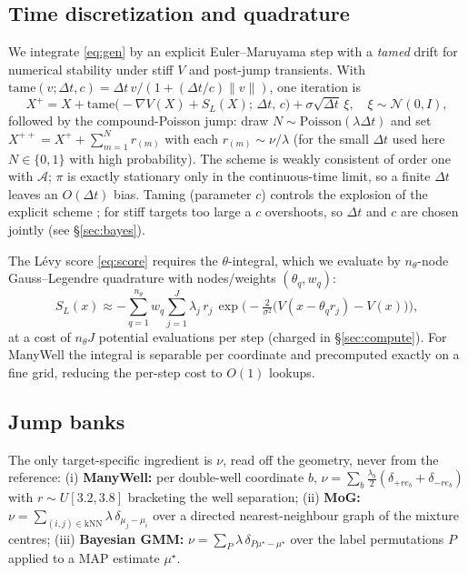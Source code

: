 \documentclass[11pt]{article}
\theoremstyle{plain}
\theoremstyle{remark}
\begin{document}
\subsection{Time discretization and quadrature}
We integrate \eqref{eq:gen} by an explicit Euler--Maruyama step with a
\emph{tamed} drift for numerical stability under stiff $V$ and post-jump
transients. With $\mathrm{tame}(v;\Delta t,c)=\Delta t\,v/(1+(\Delta t/c)\|v\|)$,
one iteration is
\begin{equation}\label{eq:euler}
X^{+}=X+\mathrm{tame}\!\big(-\nabla V(X)+S_L(X);\,\Delta t,\,c\big)+\sigma\sqrt{\Delta t}\,\xi,
\quad \xi\sim\mathcal N(0,I),
\end{equation}
followed by the compound-Poisson jump: draw $N\sim\mathrm{Poisson}(\lambda\Delta t)$
and set $X^{++}=X^{+}+\sum_{m=1}^{N} r_{(m)}$ with each $r_{(m)}\sim\nu/\lambda$
(for the small $\Delta t$ used here $N\in\{0,1\}$ with high probability). The
scheme is weakly consistent of order one with $\mathcal A$; $\pi$ is exactly
stationary only in the continuous-time limit, so a finite $\Delta t$ leaves an
$O(\Delta t)$ bias. Taming (parameter $c$) controls the explosion of the explicit
scheme \cite{hutzenthaler2012}; for stiff targets too large a $c$ overshoots, so
$\Delta t$ and $c$ are chosen jointly (see \S\ref{sec:bayes}).

The L\'evy score \eqref{eq:score} requires the $\theta$-integral, which we evaluate
by $n_\theta$-node Gauss--Legendre quadrature with nodes/weights
$(\theta_q,w_q)$:
\[
S_L(x)\approx-\sum_{q=1}^{n_\theta} w_q\sum_{j=1}^{J}\lambda_j\,r_j\,
\exp\!\Big(-\tfrac{2}{\sigma^2}\big(V(x-\theta_q r_j)-V(x)\big)\Big),
\]
at a cost of $n_\theta J$ potential evaluations per step (charged in
\S\ref{sec:compute}). For ManyWell the integral is separable per coordinate and
precomputed exactly on a fine grid, reducing the per-step cost to $O(1)$ lookups.

\subsection{Jump banks}
The only target-specific ingredient is $\nu$, read off the geometry, never from the
reference: (i) \textbf{ManyWell:} per double-well coordinate $b$,
$\nu=\sum_b \tfrac{\lambda_b}{2}(\delta_{+r e_b}+\delta_{-r e_b})$ with
$r\sim U[3.2,3.8]$ bracketing the well separation; (ii) \textbf{MoG:}
$\nu=\sum_{(i,j)\in\mathrm{kNN}}\lambda\,\delta_{\mu_j-\mu_i}$ over a directed
nearest-neighbour graph of the mixture centres; (iii) \textbf{Bayesian GMM:}
$\nu=\sum_{P}\lambda\,\delta_{P\mu^\star-\mu^\star}$ over the label permutations $P$
applied to a MAP estimate $\mu^\star$.
\end{document}
